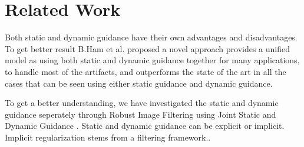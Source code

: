 \documentclass[10pt,twocolumn,letterpaper]{article}
\begin{document}
\section{Related Work}

Both static and dynamic guidance have their own advantages and disadvantages. To get better result B.Ham et al.\cite{ham2015robust} proposed a novel approach provides a unified model as using both static and dynamic guidance together for many applications, to handle most of the artifacts, and outperforms the state of the art in all the cases that can be seen using either static guidance and dynamic guidance.

To get a better understanding, we have investigated the static and dynamic guidance seperately through Robust Image Filtering using Joint Static and Dynamic
Guidance\cite{ham2015robust} . Static and dynamic guidance can be explicit or implicit. Implicit regularization stems from a filtering framework.\cite{ham2015robust}. 
\end{document}
